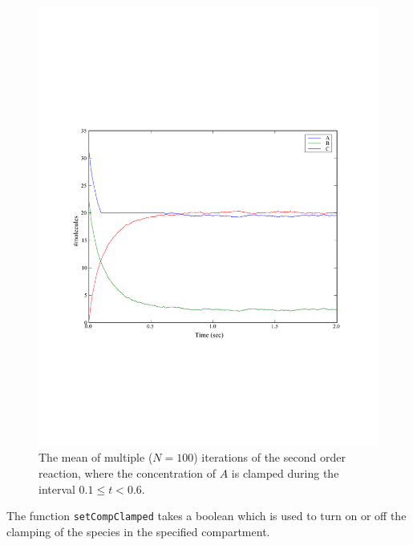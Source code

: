 \documentclass[a4paper,12pt]{book}
\begin{document}
\begin{figure}
\centering
\includegraphics[width=13cm]{chap02_secondorderreaction06.pdf}
\caption{The mean of multiple ($N=100$) iterations of the second order reaction, where the concentration of $A$ is clamped during the interval $0.1 \leq t < 0.6$.}
\label{fig:chap02:secondorderreaction06}
\end{figure}

The function \texttt{setCompClamped} takes a boolean which is used to turn on or off the clamping of the species in the specified compartment. 
\end{document}
